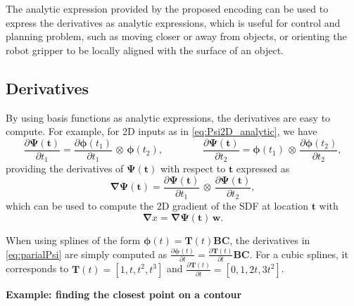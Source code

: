 \documentclass[10pt,a4paper]{article} %
\begin{document}
The analytic expression provided by the proposed encoding can be used to express the derivatives as analytic expressions, which is useful for control and planning problem, such as moving closer or away from objects, or orienting the robot gripper to be locally aligned with the surface of an object.


\subsection{Derivatives}

By using basis functions as analytic expressions, the derivatives are easy to compute. For example, for 2D inputs as in \eqref{eq:Psi2D_analytic}, we have   
\begin{equation}
	\frac{\partial\bm{\Psi}(\bm{t})}{\partial t_1} = \frac{\partial\bm{\phi}(t_1)}{\partial t_1} \,\otimes\, \bm{\phi}(t_2),
	\qquad\qquad
	\frac{\partial\bm{\Psi}(\bm{t})}{\partial t_2} = \bm{\phi}(t_1) \,\otimes\, \frac{\partial\bm{\phi}(t_2)}{\partial t_2},
	\label{eq:parialPsi}
\end{equation}
providing the derivatives of $\bm{\Psi}(\bm{t})$ with respect to $\bm{t}$ expressed as
\begin{equation}
	\bm{\nabla}\bm{\Psi}(\bm{t}) = \frac{\partial\bm{\Psi}(\bm{t})}{\partial t_1} \,\otimes\, \frac{\partial\bm{\Psi}(\bm{t})}{\partial t_2},
	\label{eq:dPsi}
\end{equation}
which can be used to compute the 2D gradient of the SDF at location $\bm{t}$ with
\begin{equation}
	\bm{\nabla}x = \bm{\nabla}\bm{\Psi}(\bm{t}) \, \bm{w}.
\end{equation}

When using splines of the form $\bm{\phi}(t)=\bm{T}(t)\bm{B}\bm{C}$, the derivatives in \eqref{eq:parialPsi} are simply computed as $\frac{\partial\bm{\phi}(t)}{\partial t}=\frac{\partial\bm{T}(t)}{\partial t} \bm{B}\bm{C}$. For a cubic splines, it corresponds to $\bm{T}(t) = [1,t,t^2,t^3]$ and $\frac{\partial\bm{T}(t)}{\partial t} = [0,1,2t,3t^2]$.\newline


\noindent\textbf{Example: finding the closest point on a contour}\newline
\end{document}
